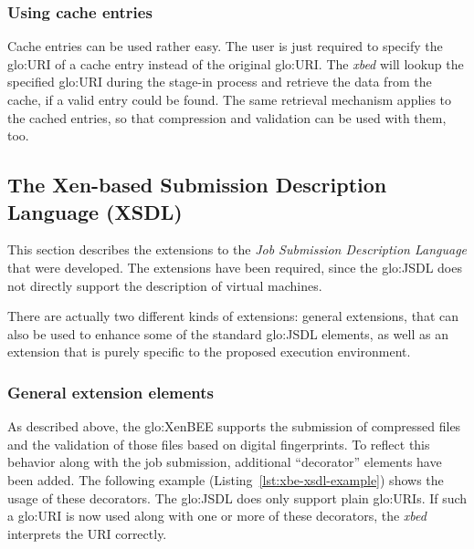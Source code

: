 \subsubsection{Using cache entries}

Cache  entries can  be used  rather  easy. The  user is  just required  to
specify  the  \gls{glo:URI} of  a  cache  entry  instead of  the  original
\gls{glo:URI}.   The \emph{xbed} will  lookup the  specified \gls{glo:URI}
during the  stage-in process and  retrieve the data  from the cache,  if a
valid entry  could be found. The  same retrieval mechanism  applies to the
cached entries, so that compression  and validation can be used with them,
too.


\subsection[The Xen-based Submission Description Language]{The Xen-based Submission Description Language (XSDL)}
\label{sec:xen-based-submission}

This  section  describes  the   extensions  to  the  \emph{Job  Submission
  Description  Language} that  were developed.   The extensions  have been
required,  since   the  \gls{glo:JSDL}  does  not   directly  support  the
description of virtual machines.

There are actually two  different kinds of extensions: general extensions,
that  can also  be used  to enhance  some of  the  standard \gls{glo:JSDL}
elements, as well as an extension  that is purely specific to the proposed
execution environment.

\subsubsection{General extension elements}

As  described  above,  the  \gls{glo:XenBEE} supports  the  submission  of
compressed  files and  the  validation  of those  files  based on  digital
fingerprints.   To reflect this  behavior along  with the  job submission,
additional ``decorator'' elements have  been added.  The following example
(Listing~\ref{lst:xbe-xsdl-example}) shows the  usage of these decorators.
The  \gls{glo:JSDL} does only  support plain  \gls{glo:URI}s.  If  such a
\gls{glo:URI} is now used along with  one or more of these decorators, the
\emph{xbed} interprets the URI correctly.

